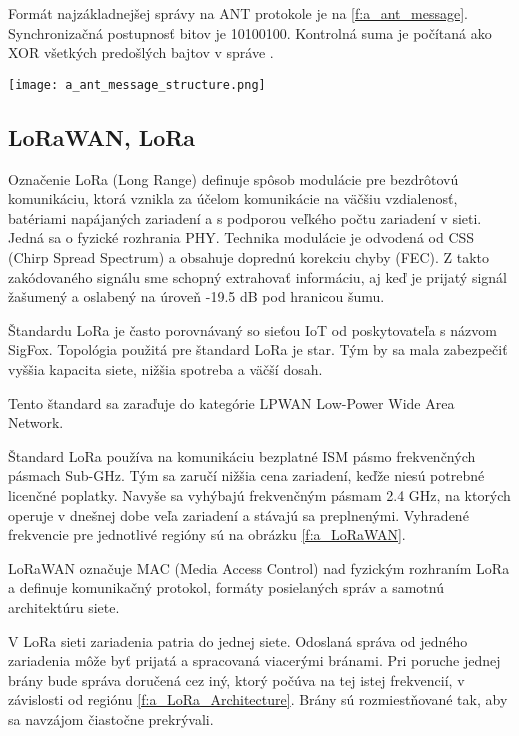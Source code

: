 \documentclass[12pt,a4wide,oneside,openright]{report}
\begin{document}
Formát najzákladnejšej správy na ANT protokole je na \ref{f:a_ant_message}. Synchronizačná postupnosť bitov je 10100100. Kontrolná suma je počítaná ako XOR všetkých predošlých bajtov v správe \cite{ANT}.

\begin{figure*}[h!]
	\centering
	\texttt{[image: a\_ant\_message\_structure.png]}
\caption{Najjednoduchší formát správy protokolu ANT\cite{ANT}.}
\label{f:a_ant_message}
\end{figure*}

\subsection{LoRaWAN, LoRa}
Označenie LoRa (Long Range) definuje spôsob modulácie pre bezdrôtovú komunikáciu, ktorá vznikla za účelom komunikácie na väčšiu vzdialenosť, batériami napájaných zariadení a s podporou veľkého počtu zariadení v sieti. Jedná sa o fyzické rozhrania PHY. Technika modulácie je odvodená od CSS (Chirp Spread Spectrum) a obsahuje doprednú korekciu chyby (FEC). Z takto zakódovaného signálu sme schopný extrahovať informáciu, aj keď je prijatý signál žašumený a oslabený na úroveň -19.5 dB pod hranicou šumu.

Štandardu LoRa je často porovnávaný so sieťou IoT od poskytovateľa s názvom SigFox. Topológia použitá pre štandard LoRa je star. Tým by sa mala zabezpečiť vyššia kapacita siete, nižšia spotreba a väčší dosah\cite{LoRaSpec}\cite{LoRaFAQ}.

Tento štandard sa zaraďuje do kategórie LPWAN Low-Power Wide Area Network. 

Štandard LoRa používa na komunikáciu bezplatné ISM pásmo frekvenčných pásmach Sub-GHz. Tým sa zaručí nižšia cena zariadení, keďže niesú potrebné licenčné poplatky. Navyše sa vyhýbajú frekvenčným pásmam 2.4 GHz, na ktorých operuje v dnešnej dobe veľa zariadení a stávajú sa preplnenými. Vyhradené frekvencie pre jednotlivé regióny sú na obrázku \ref{f:a_LoRaWAN}.

LoRaWAN označuje MAC (Media Access Control) nad fyzickým rozhraním LoRa a definuje komunikačný protokol, formáty posielaných správ a samotnú architektúru siete.

V LoRa sieti zariadenia patria do jednej siete. Odoslaná správa od jedného zariadenia môže byť prijatá a spracovaná viacerými bránami. Pri poruche jednej brány bude správa doručená cez iný, ktorý počúva na tej istej frekvencií, v závislosti od regiónu \ref{f:a_LoRa_Architecture}. Brány sú rozmiestňované tak, aby sa navzájom čiastočne prekrývali.
\end{document}
